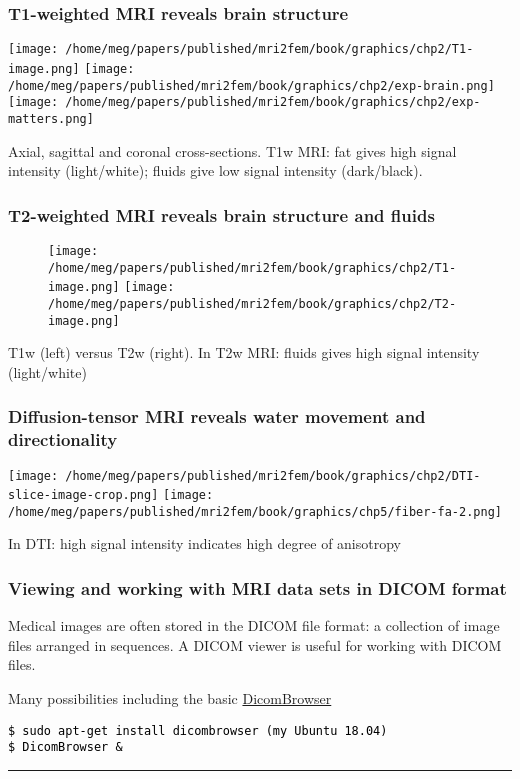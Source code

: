 \documentclass[10pt, mathserif, aspectratio=169, t, usenames, dvipsnames]{beamer}
\def\formtmpX#1#2{{\vskip3pt\noindent\fboxsep=0pt{\parbox{\textwidth}{\hbox to \textwidth{\hskip3pt\vbox{\raggedright\noindent\textbf{#2\vphantom{Qy}}}\hfill}}}\vskip3pt\par
\noindent\kern0pt}}
\newenvironment{programcode}[1]{\ignorespaces\def\stmtopen##1{##1}%
\formtmpX{programcode}{\centerline{\small{#1}}}}{\noindent\textcolor{programcode}{\rule{\columnwidth}{0pt}}\par\addvspace{\baselineskip}}%
\newcommand{\terminal}[1]{
  \vspace{-1em}
  \begin{programcode}{}%
    \colorbox{blue!10}{\parbox{0.98\textwidth}{\textcolor{black}{\texttt{#1}}}}
  \end{programcode}
  \vspace{-0.5em}
}
\begin{document}
\begin{frame}
  \frametitle{T1-weighted MRI reveals brain structure}
  \begin{center}
  \texttt{[image: /home/meg/papers/published/mri2fem/book/graphics/chp2/T1-image.png]}
  \texttt{[image: /home/meg/papers/published/mri2fem/book/graphics/chp2/exp-brain.png]}
  \texttt{[image: /home/meg/papers/published/mri2fem/book/graphics/chp2/exp-matters.png]}
  \end{center}

  Axial, sagittal and coronal cross-sections. T1w MRI: fat gives high
  signal intensity (light/white); fluids give low signal intensity
  (dark/black).
\end{frame}

\begin{frame}
  \frametitle{T2-weighted MRI reveals brain structure and fluids}
\begin{figure}
  \centering
  \texttt{[image: /home/meg/papers/published/mri2fem/book/graphics/chp2/T1-image.png]}
  \hspace{2em}
  \texttt{[image: /home/meg/papers/published/mri2fem/book/graphics/chp2/T2-image.png]}
\end{figure}
T1w (left) versus T2w (right). In T2w MRI: fluids gives high signal intensity (light/white)
\end{frame}

\begin{frame}
  \frametitle{Diffusion-tensor MRI reveals water movement and directionality}
  \begin{center}
  \texttt{[image: /home/meg/papers/published/mri2fem/book/graphics/chp2/DTI-slice-image-crop.png]}
  \hspace{2em}
  \texttt{[image: /home/meg/papers/published/mri2fem/book/graphics/chp5/fiber-fa-2.png]}
  \end{center}
  In DTI: high signal intensity indicates high degree of anisotropy 
\end{frame}

\begin{frame}
  \frametitle{Viewing and working with MRI data sets in DICOM format}

  Medical images are often stored in the DICOM file format: a
  collection of image files arranged in sequences. A DICOM viewer is
  useful for working with DICOM files.

  \bigskip
  
  Many possibilities including the basic \href{https://wiki.xnat.org/xnat-tools/dicombrowser}{DicomBrowser}

  \bigskip
  
  \terminal{\$ sudo apt-get install dicombrowser \hfill(my Ubuntu 18.04)\\
  \$ DicomBrowser \&}
\end{frame}
\end{document}
